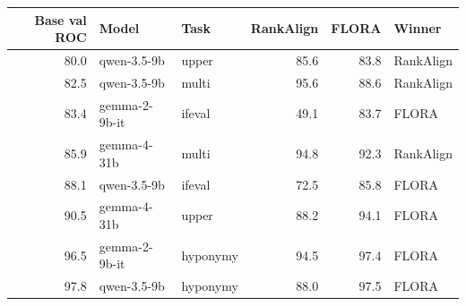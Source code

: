 \begin{tabular}{rllrrl}
\toprule
Base val ROC & Model & Task & RankAlign & FLORA & Winner \\
\midrule
80.0 & qwen-3.5-9b & upper & 85.6 & 83.8 & RankAlign \\
82.5 & qwen-3.5-9b & multi & 95.6 & 88.6 & RankAlign \\
83.4 & gemma-2-9b-it & ifeval & 49.1 & 83.7 & FLORA \\
85.9 & gemma-4-31b & multi & 94.8 & 92.3 & RankAlign \\
88.1 & qwen-3.5-9b & ifeval & 72.5 & 85.8 & FLORA \\
90.5 & gemma-4-31b & upper & 88.2 & 94.1 & FLORA \\
96.5 & gemma-2-9b-it & hyponymy & 94.5 & 97.4 & FLORA \\
97.8 & qwen-3.5-9b & hyponymy & 88.0 & 97.5 & FLORA \\
\bottomrule
\end{tabular}
